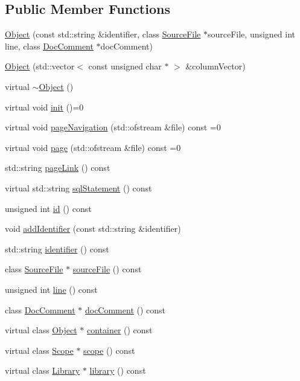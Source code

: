 \subsection*{Public Member Functions}
\begin{CompactItemize}
\item 
\hyperlink{classvjassdoc_1_1Object_253d645fca4eb52e3d10226fab1d3673}{Object} (const std::string \&identifier, class \hyperlink{classvjassdoc_1_1SourceFile}{SourceFile} $\ast$sourceFile, unsigned int line, class \hyperlink{classvjassdoc_1_1DocComment}{DocComment} $\ast$docComment)
\item 
\hyperlink{classvjassdoc_1_1Object_2e185664aec8264f2fe55500768dc77f}{Object} (std::vector$<$ const unsigned char $\ast$ $>$ \&columnVector)
\item 
virtual \hyperlink{classvjassdoc_1_1Object_ee368858fe1d3723b95600c12a474b38}{$\sim$Object} ()
\item 
virtual void \hyperlink{classvjassdoc_1_1Object_bd43e77dbe80055f5adda67661dfaca4}{init} ()=0
\item 
virtual void \hyperlink{classvjassdoc_1_1Object_736bbb6719edd8070d8f56c364a2764c}{pageNavigation} (std::ofstream \&file) const =0
\item 
virtual void \hyperlink{classvjassdoc_1_1Object_a0489e38956f3507566b1bc6e3e2c8af}{page} (std::ofstream \&file) const =0
\item 
std::string \hyperlink{classvjassdoc_1_1Object_6007f5c1d887da284a5dffd878ff67d6}{pageLink} () const 
\item 
virtual std::string \hyperlink{classvjassdoc_1_1Object_4e8ebbb0ce5b0bf91ec847b1e4a9f8fc}{sqlStatement} () const 
\item 
unsigned int \hyperlink{classvjassdoc_1_1Object_0eaa0868e7e182a8de1fc4061cd21327}{id} () const 
\item 
void \hyperlink{classvjassdoc_1_1Object_64ce402e1f66de46106dcaaa7f7423f5}{addIdentifier} (const std::string \&identifier)
\item 
std::string \hyperlink{classvjassdoc_1_1Object_c2927d3fd29e7b9ba25a481f6c0bcd75}{identifier} () const 
\item 
class \hyperlink{classvjassdoc_1_1SourceFile}{SourceFile} $\ast$ \hyperlink{classvjassdoc_1_1Object_c09bed4bd1d246d9aa8b96b9317a2b4a}{sourceFile} () const 
\item 
unsigned int \hyperlink{classvjassdoc_1_1Object_e0124e6b7fd1642276274c058b280abf}{line} () const 
\item 
class \hyperlink{classvjassdoc_1_1DocComment}{DocComment} $\ast$ \hyperlink{classvjassdoc_1_1Object_57a2a1b81c481ee49738df29f1f63b2b}{docComment} () const 
\item 
virtual class \hyperlink{classvjassdoc_1_1Object}{Object} $\ast$ \hyperlink{classvjassdoc_1_1Object_b3729c3b063682f94b43a42546c90e96}{container} () const 
\item 
virtual class \hyperlink{classvjassdoc_1_1Scope}{Scope} $\ast$ \hyperlink{classvjassdoc_1_1Object_0738d05b196cc8b9e89d62839d81fc20}{scope} () const 
\item 
virtual class \hyperlink{classvjassdoc_1_1Library}{Library} $\ast$ \hyperlink{classvjassdoc_1_1Object_cc4241505c5bcdd0bbcb08a1b665b3fd}{library} () const 
\end{CompactItemize}
